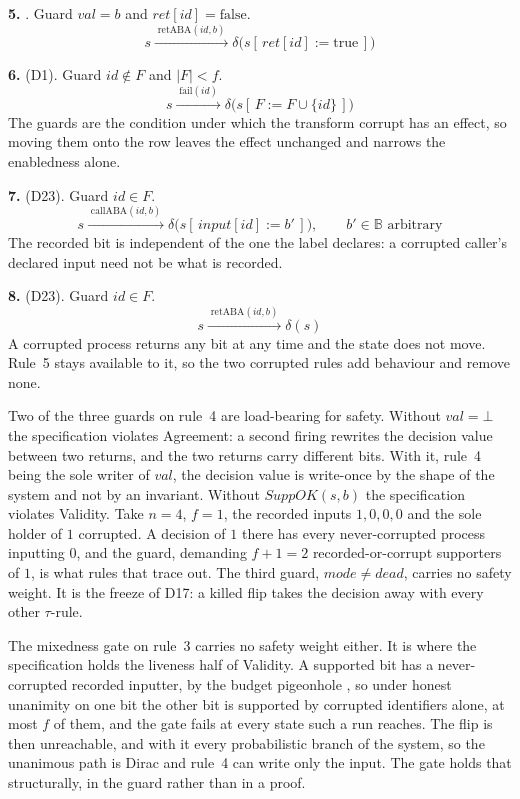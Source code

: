 \noindent\textbf{5.} .
Guard $val = b$ and $ret[id] = \mathrm{false}$.
\[ s \xrightarrow{\;\mathrm{retABA}(id,b)\;}
   \delta\bigl(s[\,ret[id] := \mathrm{true}\,]\bigr) \]

\noindent\textbf{6.}  (D1).
Guard $id \notin F$ and $|F| < f$.
\[ s \xrightarrow{\;\mathrm{fail}(id)\;}
   \delta\bigl(s[\,F := F \cup \{id\}\,]\bigr) \]
The guards are the condition under which the transform $\mathrm{corrupt}$ has an effect, so moving them onto the row leaves the effect unchanged and narrows the enabledness alone.

\noindent\textbf{7.}  (D23).
Guard $id \in F$.
\[ s \xrightarrow{\;\mathrm{callABA}(id,b)\;}
   \delta\bigl(s[\,input[id] := b'\,]\bigr),
   \qquad b' \in \mathbb{B} \text{ arbitrary} \]
The recorded bit is independent of the one the label declares: a corrupted caller's declared input need not be what is recorded.

\noindent\textbf{8.}  (D23).
Guard $id \in F$.
\[ s \xrightarrow{\;\mathrm{retABA}(id,b)\;} \delta(s) \]
A corrupted process returns any bit at any time and the state does not move.
Rule~5 stays available to it, so the two corrupted rules add behaviour and remove none.

\medskip
\noindent Two of the three guards on rule~4 are load-bearing for safety.
Without $val = \bot$ the specification violates Agreement: a second firing rewrites the decision value between two returns, and the two returns carry different bits.
With it, rule~4 being the sole writer of $val$, the decision value is write-once by the shape of the system and not by an invariant.
Without $SuppOK(s,b)$ the specification violates Validity.
Take $n = 4$, $f = 1$, the recorded inputs $1,0,0,0$ and the sole holder of $1$ corrupted.
A decision of $1$ there has every never-corrupted process inputting $0$, and the guard, demanding $f + 1 = 2$ recorded-or-corrupt supporters of $1$, is what rules that trace out.
The third guard, $mode \neq dead$, carries no safety weight.
It is the freeze of D17: a killed flip takes the decision away with every other $\tau$-rule.

\noindent The mixedness gate on rule~3 carries no safety weight either.
It is where the specification holds the liveness half of Validity.
A supported bit has a never-corrupted recorded inputter, by the budget pigeonhole , so under honest unanimity on one bit the other bit is supported by corrupted identifiers alone, at most $f$ of them, and the gate fails at every state such a run reaches.
The flip is then unreachable, and with it every probabilistic branch of the system, so the unanimous path is Dirac and rule~4 can write only the input.
The gate holds that structurally, in the guard rather than in a proof.

